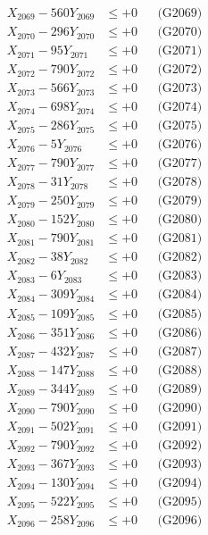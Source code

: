 \documentclass[a4paper,10pt]{article}
\begin{document}
{\begin{align}
X_{2069} - 560Y_{2069} &\leq +0 && \text{(G2069)} \\
X_{2070} - 296Y_{2070} &\leq +0 && \text{(G2070)} \\
\allowbreak
X_{2071} - 95Y_{2071} &\leq +0 && \text{(G2071)} \\
X_{2072} - 790Y_{2072} &\leq +0 && \text{(G2072)} \\
X_{2073} - 566Y_{2073} &\leq +0 && \text{(G2073)} \\
X_{2074} - 698Y_{2074} &\leq +0 && \text{(G2074)} \\
X_{2075} - 286Y_{2075} &\leq +0 && \text{(G2075)} \\
X_{2076} - 5Y_{2076} &\leq +0 && \text{(G2076)} \\
X_{2077} - 790Y_{2077} &\leq +0 && \text{(G2077)} \\
X_{2078} - 31Y_{2078} &\leq +0 && \text{(G2078)} \\
X_{2079} - 250Y_{2079} &\leq +0 && \text{(G2079)} \\
X_{2080} - 152Y_{2080} &\leq +0 && \text{(G2080)} \\
\allowbreak
X_{2081} - 790Y_{2081} &\leq +0 && \text{(G2081)} \\
X_{2082} - 38Y_{2082} &\leq +0 && \text{(G2082)} \\
X_{2083} - 6Y_{2083} &\leq +0 && \text{(G2083)} \\
X_{2084} - 309Y_{2084} &\leq +0 && \text{(G2084)} \\
X_{2085} - 109Y_{2085} &\leq +0 && \text{(G2085)} \\
X_{2086} - 351Y_{2086} &\leq +0 && \text{(G2086)} \\
X_{2087} - 432Y_{2087} &\leq +0 && \text{(G2087)} \\
X_{2088} - 147Y_{2088} &\leq +0 && \text{(G2088)} \\
X_{2089} - 344Y_{2089} &\leq +0 && \text{(G2089)} \\
X_{2090} - 790Y_{2090} &\leq +0 && \text{(G2090)} \\
\allowbreak
X_{2091} - 502Y_{2091} &\leq +0 && \text{(G2091)} \\
X_{2092} - 790Y_{2092} &\leq +0 && \text{(G2092)} \\
X_{2093} - 367Y_{2093} &\leq +0 && \text{(G2093)} \\
X_{2094} - 130Y_{2094} &\leq +0 && \text{(G2094)} \\
X_{2095} - 522Y_{2095} &\leq +0 && \text{(G2095)} \\
X_{2096} - 258Y_{2096} &\leq +0 && \text{(G2096)} \\

\end{align}}
\end{document}
